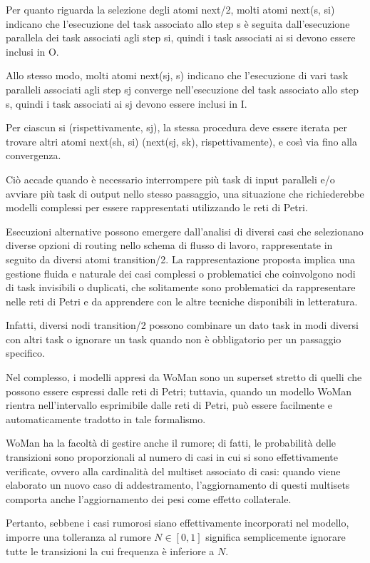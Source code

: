 Per quanto riguarda la selezione degli atomi next/2, molti atomi next(s, si) indicano che l'esecuzione del task associato allo step s è seguita dall'esecuzione parallela dei task associati agli step si, quindi i task associati ai si devono essere inclusi in O. 

Allo stesso modo, molti atomi next(sj, s) indicano che l'esecuzione di vari task paralleli associati agli step sj converge nell'esecuzione del task associato allo step s, quindi i task associati ai sj devono essere inclusi in I.

Per ciascun si (rispettivamente, sj), la stessa procedura deve essere iterata per trovare altri atomi next(sh, si) (next(sj, sk), rispettivamente), e così via fino alla convergenza. 

Ciò accade quando è necessario interrompere più task di input paralleli e/o avviare più task di output nello stesso passaggio, una situazione che richiederebbe modelli complessi per essere rappresentati utilizzando le reti di Petri.

Esecuzioni alternative possono emergere dall'analisi di diversi casi che selezionano diverse opzioni di routing nello schema di flusso di lavoro, rappresentate in seguito da diversi atomi transition/2. La rappresentazione proposta implica una gestione fluida e naturale dei casi complessi o problematici che coinvolgono nodi di task invisibili o duplicati, che solitamente sono problematici da rappresentare nelle reti di Petri e da apprendere con le altre tecniche disponibili in letteratura. 

Infatti, diversi nodi transition/2 possono combinare un dato task in modi diversi con altri task o ignorare un task quando non è obbligatorio per un passaggio specifico. 

Nel complesso, i modelli appresi da WoMan sono un superset stretto di quelli che possono essere espressi dalle reti di Petri; tuttavia, quando un modello WoMan rientra nell'intervallo esprimibile dalle reti di Petri, può essere facilmente e automaticamente tradotto in tale formalismo.

WoMan ha la facoltà di gestire anche il rumore; di fatti, le probabilità delle transizioni sono proporzionali al numero di casi in cui si sono effettivamente verificate, ovvero alla cardinalità del multiset associato di casi: quando viene elaborato un nuovo caso di addestramento, l'aggiornamento di questi multisets comporta anche l'aggiornamento dei pesi come effetto collaterale. 

Pertanto, sebbene i casi rumorosi siano effettivamente incorporati nel modello, imporre una tolleranza al rumore $N \in [0,1]$ significa semplicemente ignorare tutte le transizioni la cui frequenza è inferiore a $N$.

